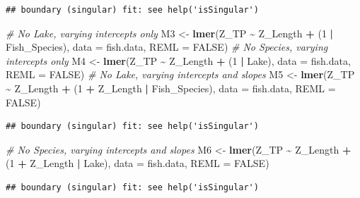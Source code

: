\documentclass[
]{article}
\newenvironment{Shaded}{\begin{snugshade}}{\end{snugshade}}
\newcommand{\AttributeTok}[1]{\textcolor[rgb]{0.13,0.29,0.53}{#1}}
\newcommand{\CommentTok}[1]{\textcolor[rgb]{0.56,0.35,0.01}{\textit{#1}}}
\newcommand{\ConstantTok}[1]{\textcolor[rgb]{0.56,0.35,0.01}{#1}}
\newcommand{\DecValTok}[1]{\textcolor[rgb]{0.00,0.00,0.81}{#1}}
\newcommand{\FunctionTok}[1]{\textcolor[rgb]{0.13,0.29,0.53}{\textbf{#1}}}
\newcommand{\NormalTok}[1]{#1}
\newcommand{\OtherTok}[1]{\textcolor[rgb]{0.56,0.35,0.01}{#1}}
\newcommand{\SpecialCharTok}[1]{\textcolor[rgb]{0.81,0.36,0.00}{\textbf{#1}}}
\begin{document}
\begin{verbatim}
## boundary (singular) fit: see help('isSingular')
\end{verbatim}

\begin{Shaded}
\begin{Highlighting}[]
\CommentTok{\# No Lake, varying intercepts only}
\NormalTok{M3 }\OtherTok{\textless{}{-}} \FunctionTok{lmer}\NormalTok{(Z\_TP }\SpecialCharTok{\textasciitilde{}}\NormalTok{ Z\_Length }\SpecialCharTok{+}\NormalTok{ (}\DecValTok{1} \SpecialCharTok{|}\NormalTok{ Fish\_Species),}
           \AttributeTok{data =}\NormalTok{ fish.data, }\AttributeTok{REML =} \ConstantTok{FALSE}\NormalTok{)}
\CommentTok{\# No Species, varying intercepts only}
\NormalTok{M4 }\OtherTok{\textless{}{-}} \FunctionTok{lmer}\NormalTok{(Z\_TP }\SpecialCharTok{\textasciitilde{}}\NormalTok{ Z\_Length }\SpecialCharTok{+}\NormalTok{ (}\DecValTok{1} \SpecialCharTok{|}\NormalTok{ Lake),}
           \AttributeTok{data =}\NormalTok{ fish.data, }\AttributeTok{REML =} \ConstantTok{FALSE}\NormalTok{)}
\CommentTok{\# No Lake, varying intercepts and slopes}
\NormalTok{M5 }\OtherTok{\textless{}{-}} \FunctionTok{lmer}\NormalTok{(Z\_TP }\SpecialCharTok{\textasciitilde{}}\NormalTok{ Z\_Length }\SpecialCharTok{+}\NormalTok{ (}\DecValTok{1} \SpecialCharTok{+}\NormalTok{ Z\_Length }\SpecialCharTok{|}\NormalTok{ Fish\_Species),}
     \AttributeTok{data =}\NormalTok{ fish.data, }\AttributeTok{REML =} \ConstantTok{FALSE}\NormalTok{)}
\end{Highlighting}
\end{Shaded}

\begin{verbatim}
## boundary (singular) fit: see help('isSingular')
\end{verbatim}

\begin{Shaded}
\begin{Highlighting}[]
\CommentTok{\# No Species, varying intercepts and slopes}
\NormalTok{M6 }\OtherTok{\textless{}{-}} \FunctionTok{lmer}\NormalTok{(Z\_TP }\SpecialCharTok{\textasciitilde{}}\NormalTok{ Z\_Length }\SpecialCharTok{+}\NormalTok{ (}\DecValTok{1} \SpecialCharTok{+}\NormalTok{ Z\_Length }\SpecialCharTok{|}\NormalTok{ Lake),}
     \AttributeTok{data =}\NormalTok{ fish.data, }\AttributeTok{REML =} \ConstantTok{FALSE}\NormalTok{)}
\end{Highlighting}
\end{Shaded}

\begin{verbatim}
## boundary (singular) fit: see help('isSingular')
\end{verbatim}
\end{document}
